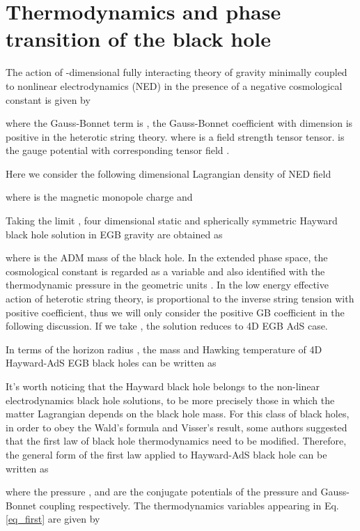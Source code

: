 \documentclass[aps,11pt]{revtex4}
\begin{document}
\section{Thermodynamics and phase transition of the black hole}
\label{pv}

The action of -dimensional fully interacting theory of gravity minimally coupled to nonlinear electrodynamics (NED) in the presence of a negative cosmological constant  is given by

where the Gauss-Bonnet term is , the Gauss-Bonnet coefficient  with dimension  is positive in the heterotic string theory.  where  is a field strength tensor tensor.  is the gauge potential with corresponding tensor field .

Here we consider the following  dimensional Lagrangian density of NED field\cite{AyonBeato:2000zs,Fernando:2016ksb}

where  is the magnetic monopole charge and


Taking the limit  \cite{Glavan:2019inb}, four dimensional static and spherically symmetric Hayward black hole solution in EGB gravity are obtained as

where  is the ADM mass of the black hole.
In the extended phase space, the cosmological constant  is regarded as a variable and also identified with the thermodynamic pressure  in the geometric units . In the low energy effective action of heterotic string theory,  is proportional to the inverse string tension with positive coefficient, thus we will only consider the positive GB coefficient  in the following discussion. If we take , the solution  reduces to 4D EGB AdS case.

In terms of the horizon radius , the mass  and Hawking temperature  of
4D Hayward-AdS EGB black holes can be written as


It's worth noticing that the Hayward black hole belongs to the non-linear electrodynamics black hole solutions, to be more precisely those in which the matter Lagrangian depends on the black hole mass\cite{Ma:2014qma}. For this class of black holes, in order to obey the Wald's formula\cite{Wald:1993nt} and Visser's result\cite{Visser:1993qa}, some authors\cite{Ma:2014qma,Balart:2017dzt,Zhang:2016ilt,Gulin:2017ycu} suggested that the first law of black hole thermodynamics need to be modified. Therefore, the general form of the first law applied to Hayward-AdS black hole can be written as

where the pressure ,  and  are the conjugate potentials of the pressure and Gauss-Bonnet coupling respectively. The thermodynamics variables appearing in Eq.\ref{eq_first} are given by
\end{document}
